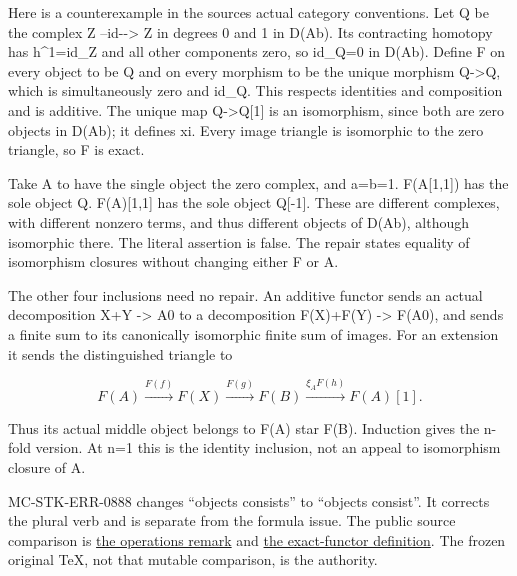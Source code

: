 \documentclass[11pt]{article}
\begin{document}
Here is a counterexample in the source\textquotesingle s actual category conventions. Let Q be the complex Z --id-\allowbreak{}-> Z in degrees 0 and 1 in D(Ab)\allowbreak{}. Its contracting homotopy has h\textasciicircum{}1\allowbreak{}=id\_\allowbreak{}Z and all other components zero,\allowbreak{} so id\_\allowbreak{}Q\allowbreak{}=0 in D(Ab)\allowbreak{}. Define F on every object to be Q and on every morphism to be the unique morphism Q\allowbreak{}->Q,\allowbreak{} which is simultaneously zero and id\_\allowbreak{}Q. This respects identities and composition and is additive. The unique map Q\allowbreak{}->Q[1]\allowbreak{} is an isomorphism,\allowbreak{} since both are zero objects in D(Ab)\allowbreak{}; it defines xi. Every image triangle is isomorphic to the zero triangle,\allowbreak{} so F is exact.

Take A to have the single object the zero complex,\allowbreak{} and a\allowbreak{}=b\allowbreak{}=1. F(A[1,\allowbreak{}1]\allowbreak{})\allowbreak{} has the sole object Q. F(A)\allowbreak{}[1,\allowbreak{}1]\allowbreak{} has the sole object Q[-1]\allowbreak{}. These are different complexes,\allowbreak{} with different nonzero terms,\allowbreak{} and thus different objects of D(Ab)\allowbreak{},\allowbreak{} although isomorphic there. The literal assertion is false. The repair states equality of isomorphism closures without changing either F or A.

The other four inclusions need no repair. An additive functor sends an actual decomposition X\allowbreak{}+Y \allowbreak{}-> A0 to a decomposition F(X)\allowbreak{}\allowbreak{}+F(Y)\allowbreak{} \allowbreak{}-> F(A0)\allowbreak{},\allowbreak{} and sends a finite sum to its canonically isomorphic finite sum of images. For an extension it sends the distinguished triangle to

\[
 F(A)\xrightarrow{F(f)}F(X)\xrightarrow{F(g)}F(B)
       \xrightarrow{\xi_A F(h)}F(A)[1].
\]

Thus its actual middle object belongs to F(A)\allowbreak{} star F(B)\allowbreak{}. Induction gives the n-fold version. At n\allowbreak{}=1 this is the identity inclusion,\allowbreak{} not an appeal to isomorphism closure of A.

MC-STK-ERR-0888 changes ``objects consists'' to ``objects consist''. It corrects the plural verb and is separate from the formula issue. The public source comparison is \href{https://stacks.math.columbia.edu/tag/0FX5}{the operations remark} and \href{https://stacks.math.columbia.edu/tag/05QK}{the exact-functor definition}. The frozen original TeX,\allowbreak{} not that mutable comparison,\allowbreak{} is the authority.
\end{document}
